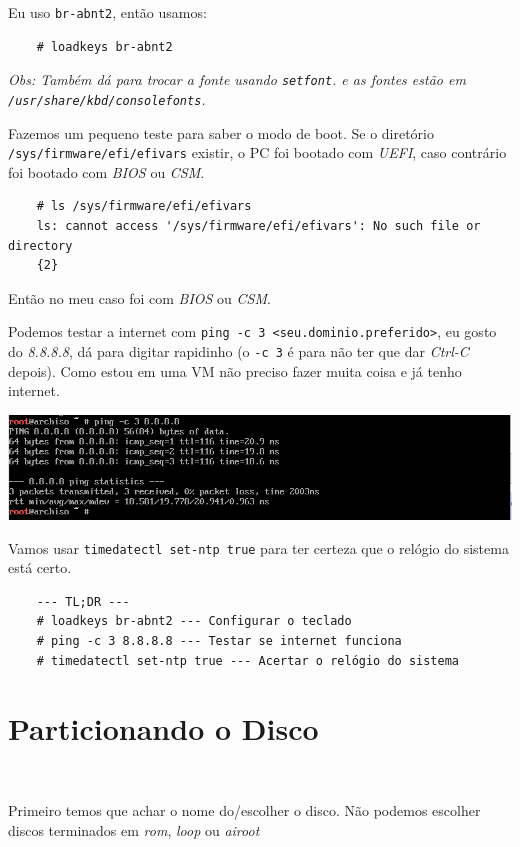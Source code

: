 \documentclass{article}
\newcommand{\obs}[1]{\textit{ Obs:#1 }}
\begin{document}
Eu uso \texttt{br-abnt2}, então usamos:

\begin{verbatim}
    # loadkeys br-abnt2
\end{verbatim}

\obs{
Também dá para trocar a fonte usando \texttt{setfont}.
e as fontes estão em \texttt{/usr/share/kbd/consolefonts}.
}

Fazemos um pequeno teste para saber o modo de boot.
Se o diretório \texttt{/sys/firmware/efi/efivars} existir,
o PC foi bootado com \emph{UEFI},
caso contrário foi bootado com \emph{BIOS} ou \emph{CSM}.

\begin{verbatim}
    # ls /sys/firmware/efi/efivars
    ls: cannot access '/sys/firmware/efi/efivars': No such file or directory
    {2}
\end{verbatim}

Então no meu caso foi com \emph{BIOS} ou \emph{CSM}.

Podemos testar a internet com \texttt{ping -c 3 <seu.dominio.preferido>},
eu gosto do \emph{8.8.8.8}, dá para digitar rapidinho
(o \texttt{-c 3} é para não ter que dar \emph{Ctrl-C} depois).
Como estou em uma VM não preciso fazer muita coisa e já tenho internet.

\begin{center}
    \includegraphics[width=\textwidth]{Imgs/Ping.png}
\end{center}

Vamos usar \texttt{timedatectl set-ntp true}
para ter certeza que o relógio do sistema está certo.

\begin{verbatim}
    --- TL;DR ---
    # loadkeys br-abnt2 --- Configurar o teclado
    # ping -c 3 8.8.8.8 --- Testar se internet funciona
    # timedatectl set-ntp true --- Acertar o relógio do sistema
\end{verbatim}

\section{Particionando o Disco}\

Primeiro temos que achar o nome do/escolher o disco.
Não podemos escolher discos terminados em
\emph{rom}, \emph{loop} ou \emph{airoot}
\end{document}

